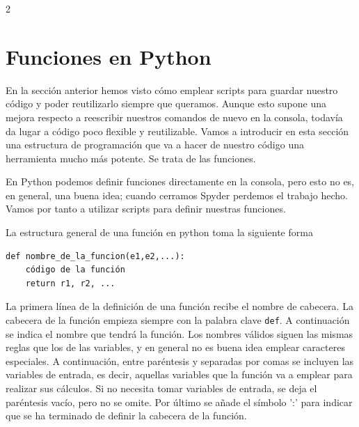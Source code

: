 \begin{paracol}{2}

\section{Funciones en Python} 
En la sección anterior hemos visto cómo emplear scripts para guardar nuestro código y poder reutilizarlo siempre que queramos. Aunque esto supone una mejora respecto a reescribir nuestros comandos de nuevo en la consola, todavía da lugar a código poco flexible y reutilizable. Vamos a introducir en esta sección una estructura de programación que va a hacer de nuestro código una herramienta mucho más potente. Se trata de las funciones.

En Python podemos definir funciones directamente en la consola, pero esto no es, en general, una buena idea; cuando cerramos Spyder perdemos el trabajo hecho. Vamos por tanto a utilizar scripts para definir nuestras funciones.

La estructura general de una función en python toma la siguiente forma

\begin{verbatim}
def nombre_de_la_funcion(e1,e2,...):
    código de la función
    return r1, r2, ...
\end{verbatim}

La primera línea de la definición de una función recibe el nombre de cabecera. La cabecera de la función empieza siempre con la palabra clave \texttt{def}. A continuación se indica el nombre que tendrá la función. Los nombres válidos siguen las mismas reglas que los de las variables, y en general no es buena idea emplear caracteres especiales. A continuación, entre paréntesis y separadas por comas se incluyen las variables de entrada, es decir, aquellas variables que la función va a emplear para realizar sus cálculos. Si no necesita tomar variables de entrada, se deja el paréntesis vacío, pero no se omite. Por último se añade el símbolo ':' para indicar que se ha terminado de definir la cabecera de la función.


\end{paracol}
